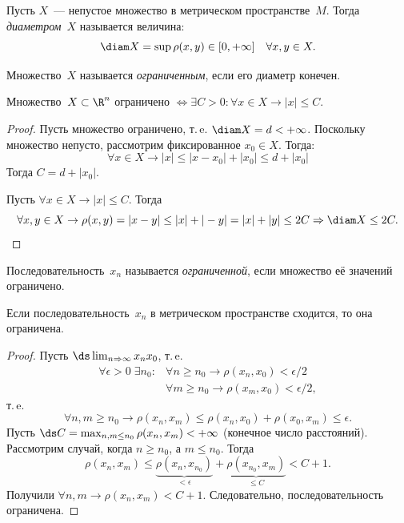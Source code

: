 \begin{definition}
Пусть \(X\)~--- непустое множество в метрическом пространстве~\(M\). Тогда \textit{диаметром}~\(X\)
называется величина:
\[
    \diam X = \sup \rho(x, y) \in [0, +\infty] \quad \forall x, y \in X.
\]
\end{definition}

\begin{definition}
Множество~\(X\) называется \textit{ограниченным}, если его диаметр конечен.
\end{definition}

\begin{statement}
Множество~\(X \subset \R^n\) ограничено \(\Longleftrightarrow \exists C > 0 \colon \forall x \in X
\rightarrow |x| \leq C\).
\end{statement}

\begin{proof}
\Boxedrightarrow Пусть множество ограничено, т.\,e. \(\diam X = d < +\infty\). Поскольку множество
непусто, рассмотрим фиксированное \(x_0 \in X\). Тогда:
\[
    \forall x \in X \rightarrow |x| \leq |x - x_0| + |x_0| \leq d + |x_0|
\]
Тогда \(C = d + |x_0|\).

\Boxedleftarrow Пусть \(\forall x \in X \rightarrow |x| \leq C\). Тогда
\[
    \forall x, y \in X \rightarrow \rho(x, y) = |x - y| \leq |x| + |-y| = |x| + |y| \leq 2C
        \Rightarrow \diam X \leq 2C.
\]
\end{proof}

\begin{definition}
Последовательность~\(x_n\) называется \textit{ограниченной}, если множество её значений ограничено.
\end{definition}

\begin{statement}
Если последовательность~\(x_n\) в метрическом пространстве сходится, то она ограничена.
\end{statement}

\begin{proof}
Пусть \(\ds\lim_{n \Rightarrow \infty} x_n x_0\), т.\,e.
\begin{align}
    \forall \epsilon > 0 \;\exists n_0 \colon &\forall n \geq n_0 \rightarrow \rho(x_n, x_0) <
        \epsilon / 2\\
    &\forall m \geq n_0 \rightarrow \rho(x_m, x_0) < \epsilon / 2,
\end{align}
т.\,e.
\[
    \forall n, m \geq n_0 \rightarrow \rho(x_n, x_m) \leq \rho(x_n, x_0) + \rho(x_0, x_m) \leq
        \epsilon.
\]
Пусть \(\ds C = \max_{n, m \leq n_0} \rho(x_n, x_m) < +\infty\) (конечное число расстояний).
Рассмотрим случай, когда \(n \geq n_0\), а \(m \leq n_0\). Тогда
\[
    \rho(x_n, x_m) \leq \underbrace{\rho(x_n, x_{n_0})}_{< \epsilon} + \underbrace{\rho(x_{n_0},
        x_m)}_{\leq C} < C + 1.
\]
Получили \(\forall n, m \rightarrow \rho(x_n, x_m) < C + 1\). Следовательно, последовательность
ограничена.
\end{proof}

